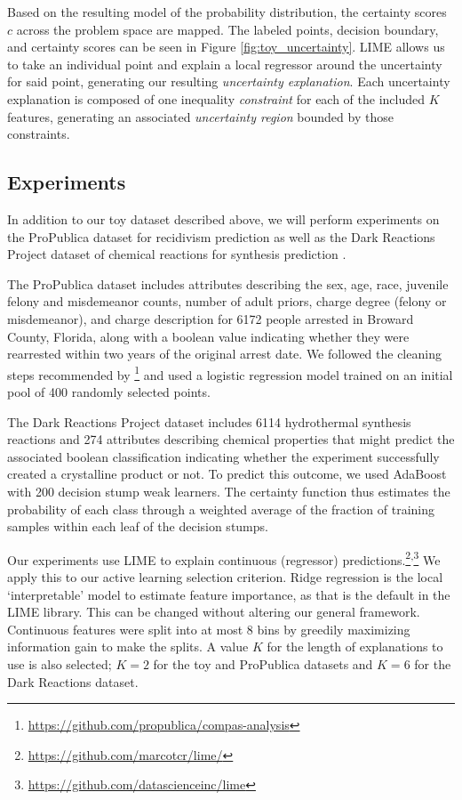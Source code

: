Based on the resulting model of the probability distribution, the certainty scores $c$ across the problem space are mapped. The labeled points, decision boundary, and certainty scores can be seen in Figure \ref{fig:toy_uncertainty}.  LIME allows us to take an individual point and explain a local regressor around the uncertainty for said point, generating our resulting \emph{uncertainty explanation}.  Each uncertainty explanation is composed of one inequality \emph{constraint} for each of the included $K$ features, generating an associated \emph{uncertainty region} bounded by those constraints.


\subsection{Experiments}
 
In addition to our toy dataset described above, we will perform experiments on the ProPublica dataset for recidivism prediction \cite{propublica} as well as the Dark Reactions Project dataset of chemical reactions for synthesis prediction \cite{drpNature}.

The ProPublica dataset includes attributes describing the sex, age, race, juvenile felony and misdemeanor counts, number of adult priors, charge degree (felony or misdemeanor), and charge description for 6172 people arrested in Broward County, Florida, along with a boolean value indicating whether they were rearrested within two years of the original arrest date.  We followed the cleaning steps recommended by \cite{propublica}\footnote{\url{https://github.com/propublica/compas-analysis}} and used a logistic regression model trained on an initial pool of 400 randomly selected points. 

The Dark Reactions Project dataset includes 6114 hydrothermal synthesis reactions and 274 attributes describing chemical properties that might predict the associated boolean classification indicating whether the experiment successfully created a crystalline product or not. To predict this outcome, we used AdaBoost with 200 decision stump weak learners. The certainty function thus estimates the probability of each class through a weighted average of the fraction of training samples within each leaf of the decision stumps. 

Our experiments use LIME \cite{LIME} to explain continuous (regressor) predictions.\footnote{\url{https://github.com/marcotcr/lime/}}\textsuperscript{,}\footnote{ \url{https://github.com/datascienceinc/lime}}   
We apply this to our active learning selection criterion. Ridge regression is the local `interpretable' model to estimate feature importance, as that is the default in the LIME library. This can be changed without altering our general framework. Continuous features were split into at most 8 bins by greedily maximizing information gain to make the splits. A value $K$ for the length of explanations to use is also selected; $K=2$ for the toy and ProPublica datasets and $K=6$ for the Dark Reactions dataset. 

